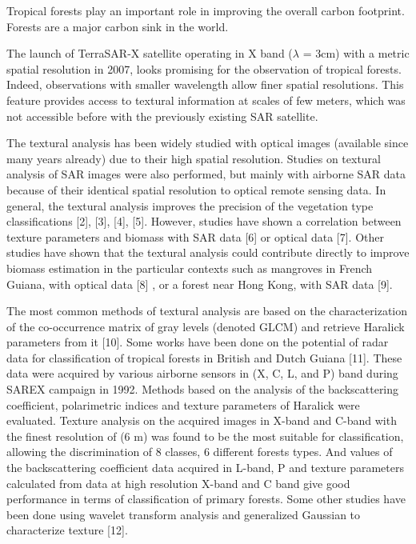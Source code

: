 \documentclass[paper=a4, fontsize=11pt]{scrartcl}
\begin{document}
Tropical forests play an important role in improving the overall carbon footprint. Forests are a major carbon sink in the world.

The launch of TerraSAR-X satellite operating in X band ($\lambda$ = 3cm) with a metric spatial resolution in 2007, looks promising for the observation of tropical forests. 
Indeed, observations with smaller wavelength allow finer spatial resolutions. 
This feature provides access to textural information at scales of few meters, which was not accessible before with the previously existing SAR satellite.

The textural analysis has been widely studied with optical images (available since many years already) due to their high spatial resolution. 
Studies on textural analysis of SAR images were also performed, but mainly with airborne SAR data because of their identical spatial resolution to optical remote sensing data. 
In general, the textural analysis improves the precision of the vegetation type classifications [2], [3], [4], [5]. 
However, studies have shown a correlation between texture parameters and biomass with SAR data [6] or optical data [7].
Other studies have shown that the textural analysis could contribute directly to improve biomass estimation in the particular contexts such as mangroves in French Guiana, with optical data [8] , or a forest near Hong Kong, with SAR data [9].

The most common methods of textural analysis are based on the characterization of the co-occurrence matrix of gray levels (denoted GLCM) and retrieve Haralick parameters from it [10]. 
Some works have been done on the potential of radar data for classification of tropical forests in British and  Dutch Guiana [11]. 
These data were acquired by various airborne sensors in (X, C, L, and P) band during SAREX campaign in 1992. 
Methods based on the analysis of the backscattering coefficient, polarimetric indices and texture parameters of Haralick were evaluated. Texture analysis on the acquired images in X-band and C-band with the finest resolution of (6 m) was found to be the most suitable for classification, allowing the discrimination of 8 classes, 6 different forests types. 
And values of the backscattering coefficient data acquired in L-band, P and texture parameters calculated from data at high resolution X-band and C band give good performance in terms of classification of primary forests. 
Some other studies have been done using wavelet transform analysis and generalized Gaussian to characterize texture [12].
\end{document}
